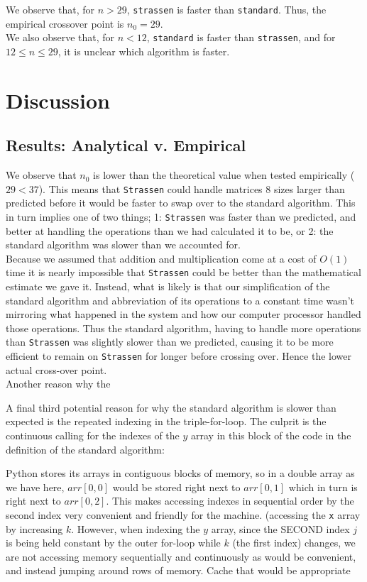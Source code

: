 \documentclass[11pt]{scrartcl}
\theoremstyle{dotlessP}
\theoremstyle{dotlessN}
\theoremstyle{dotN}
\begin{document}
We observe that, for $n > 29$, \texttt{strassen} is faster than \texttt{standard}. Thus, the empirical crossover point is $n_0 = 29$. 
\\

We also observe that, for $n < 12$, \texttt{standard} is faster than \texttt{strassen}, and for $12 \leq n \leq 29$, it is unclear which algorithm is faster.

\section{Discussion}
\subsection{Results: Analytical v. Empirical}
We observe that $n_0$ is lower than the theoretical value when tested empirically ($29 < 37$). This means that \texttt{Strassen} could handle matrices 8 sizes larger than predicted before it would be faster to swap over to the standard algorithm. This in turn implies one of two things; 1: \texttt{Strassen} was faster than we predicted, and better at handling the operations than we had calculated it to be, or 2: the standard algorithm was slower than we accounted for. \\

Because we assumed that addition and multiplication come at a cost of $O(1)$ time it is nearly impossible that \texttt{Strassen} could be better than the mathematical estimate we gave it. Instead, what is likely is that our simplification of the standard algorithm and abbreviation of its operations to a constant time wasn't mirroring what happened in the system and how our computer processor handled those operations. Thus the standard algorithm, having to handle more operations than \texttt{Strassen} was slightly slower than we predicted, causing it to be more efficient to remain on \texttt{Strassen} for longer before crossing over. Hence the lower actual cross-over point. \\

Another reason why the 


A final third potential reason for why the standard algorithm is slower than expected is the repeated indexing in the triple-for-loop. The culprit is the continuous calling for the indexes of the $y$ array in this block of the code in the definition of the standard algorithm:

Python stores its arrays in contiguous blocks of memory, so in a double array as we have here, $arr[0, 0]$ would be stored right next to $arr[0, 1]$ which in turn is right next to $arr[0, 2]$. This makes accessing indexes in sequential order by the second index very convenient and friendly for the machine. (accessing the \texttt{x} array by increasing $k$. However, when indexing the $y$ array, since the SECOND index $j$ is being held constant by the outer for-loop while $k$ (the first index) changes, we are not accessing memory sequentially and continuously as would be convenient, and instead jumping around rows of memory. Cache that would be appropriate 
\end{document}
